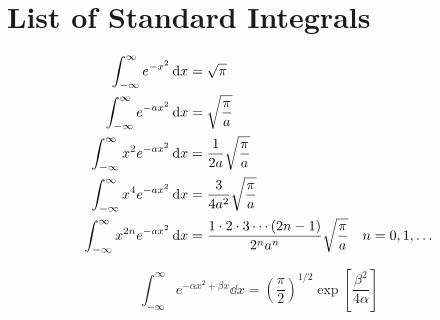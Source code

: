 \label{appendix1.Integrals}

\ifpdf
\graphicspath{{Appendix1/figs/}}
\else
\graphicspath{{Appendix1/figs/}}
\fi

\section{List of Standard Integrals}
\begin{align}
\label{appendix1.eqn1}
\int_{-\infty}^{\infty} e^{-x^2} \dd{x} &= \sqrt{\pi} \\
\label{appendix1.eqn2}
\int_{-\infty}^{\infty} e^{-ax^2} \dd{x} &=  \sqrt{\frac{\pi}{a}} \\
\label{appendix1.eqn3}
\int_{-\infty}^{\infty} x^2 e^{-ax^2}  \dd{x} &= \frac{1}{2 a} \sqrt{\frac{\pi}{a}} \\
\label{appendix1.eqn4}
\int_{-\infty}^{\infty} x^4 e^{-ax^2}  \dd{x} &= \frac{3}{4 a^2} \sqrt{\frac{\pi}{a}} \\
\label{appendix1.eqn5}
\int_{-\infty}^{\infty} x^{2 n} e^{-ax^2}  \dd{x} &=  \frac{1\cdot 2 \cdot 3 \cdots \qty(2n - 1)}{2^n a^n}\sqrt{\frac{\pi}{a}} \quad n=0,1,\ldots
\end{align}




\begin{equation}
\int_{-\infty}^{\infty} e^{-\alpha x^2 + \beta x} \dd{x} = \left(\frac{\pi}{2}\right)^{1/2} \exp\left[\frac{\beta^2}{4\alpha}\right]
\label{appendix1.eqn6}
\end{equation}


